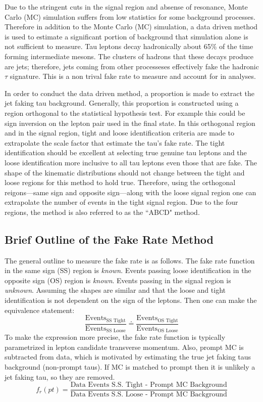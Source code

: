 
Due to the stringent cuts in the signal region and absense of resonance, Monte Carlo (MC) simulation suffers from low statistics for some background processes.  
Therefore in addition to the Monte Carlo (MC) simulation, a data driven method is used to estimate a significant portion of background that simulation alone is not sufficient to measure. 
Tau leptons decay hadronically about 65\% of the time forming intermediate mesons. 
The clusters of hadrons that these decays produce are jets; therefore, jets coming from other processeses effectively fake the hadronic $\tau$ signature. This is a non trival fake rate to measure and account for in analyses. 

In order to conduct the data driven method, a proportion is made to extract the jet faking tau background. Generally, this proportion is constructed using a region orthogonal to the statistical hypothesis test. For example this could be sign inversion on the lepton pair used in the final state. In this orthogonal region and in the signal region, tight and loose identification criteria are made to extrapolate the scale factor that estimate the tau's fake rate. 
The tight identification should be excellent at selecting true genuine tau leptons and the loose identification more inclusive to all tau leptons even those that are fake. 
The shape of the kinematic distributions should not change between the tight and loose regions for this method to hold true. 
Therefore, using the orthogonal reigons---same sign and opposite sign---along with the loose signal region one can extrapolate the number of events in the tight signal region. Due to the four regions, the method is also referred to as the ``ABCD" method. 


\subsection{Brief Outline of the Fake Rate Method}
The general outline to measure the fake rate is as follows.
The fake rate function in the same sign (SS) region is \textit{known}.
Events passing loose identification in the opposite sign (OS) region is \textit{known}.
Events passing in the signal region is \textit{unknown}. 
Assuming the shapes are similar and that the loose and tight identification is not dependent on the sign of the leptons. Then one can make the equivalence statement: 
\begin{equation}
\label{eq:abcd}
\frac{\text{Events}_\text{SS Tight}}{\text{Events}_\text{SS Loose}} \doteq \frac{\text{Events}_\text{OS Tight}}{\text{Events}_\text{OS Loose}}
\end{equation}
To make the expression more precise, the fake rate function is typically parametrized in lepton candidate transverse momentum. 
 Also, prompt MC is subtracted from data, which is motivated by estimating the true jet faking taus background (non-prompt taus). If MC is matched to prompt then it is unlikely a jet faking tau, so they are removed. 
\begin{equation}f_r(pt)=\frac{\text{Data Events S.S. Tight - Prompt MC Background}}{\text{Data Events S.S. Loose - Prompt MC Background}}\end{equation} 

